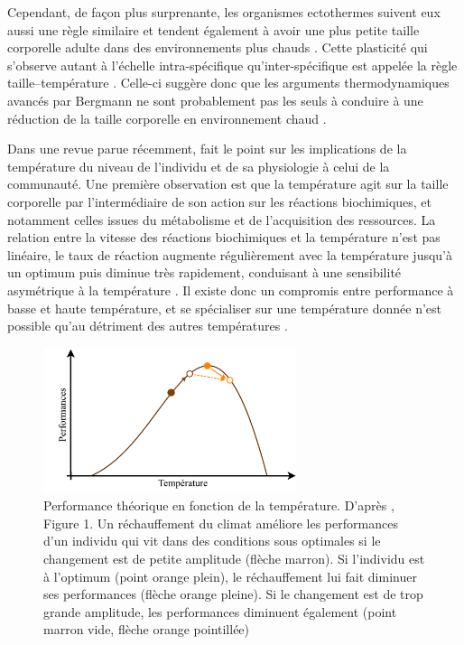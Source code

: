 Cependant, de façon plus surprenante, les organismes ectothermes suivent eux
aussi une règle similaire et tendent également à avoir une plus petite taille
corporelle adulte dans des environnements plus chauds
\autocites{angilletta2009a,ohlberger2013a}.
Cette plasticité qui s'observe autant à l'échelle intra-spécifique
qu'inter-spécifique est appelée la règle taille--température
\autocites[``\textbf{temperature--size rule}''][]{atkinson1994a}. Celle-ci
suggère donc que les arguments thermodynamiques avancés par Bergmann ne sont
probablement pas les seuls à conduire à une réduction de la taille corporelle en
environnement chaud \autocite{edeline2013a}.

Dans une revue parue récemment, \textcite{ohlberger2013a} fait le point sur les
implications de la température du niveau de l'individu et de sa physiologie à
celui de la communauté. Une première observation est que la température agit sur
la taille corporelle par l'intermédiaire de son action sur les réactions
biochimiques, et notamment celles issues du métabolisme et de l'acquisition des
ressources. La relation entre la vitesse des réactions biochimiques et la
température n'est pas linéaire, le taux de réaction augmente régulièrement avec
la température jusqu'à un optimum puis diminue très rapidement, conduisant à une
sensibilité asymétrique à la température \autocites{hochachka2002a,
angilletta2009a}. Il existe donc un compromis entre performance à basse et haute
température, et se spécialiser sur une température donnée n'est possible qu'au
détriment des autres températures \autocites{angilletta2009a}.

\begin{figure}[!ht] %
\centering
\includegraphics[width=0.66\textwidth]{1_CorpsDeThese/EA/Fig/ThermalCurve.pdf}
\caption[
Performance théorique en fonction de la température]{Performance théorique en
fonction de la température. D'après \textcites{ohlberger2013a}, Figure 1. Un
réchauffement du climat améliore les performances d'un individu qui vit dans
des conditions sous optimales si le changement est de petite amplitude (flèche
marron). Si l'individu est à l'optimum (point orange plein), le réchauffement
lui fait diminuer ses performances (flèche orange pleine). Si le changement est
de trop grande amplitude, les performances diminuent également (point marron
vide, flèche orange pointillée)}
\label{Fig:EA1}
\end{figure}

